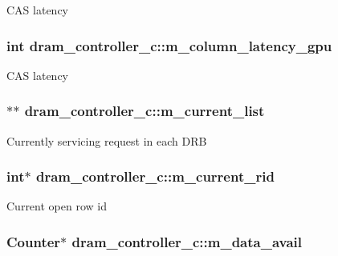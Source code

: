 \label{classdram__controller__c_a5f58c9560276617cab02c610b01b2cb1}
CAS latency \hypertarget{classdram__controller__c_a6b725908a9e2d0f284780dfa345d6160}{
\subsubsection[{m\_\-column\_\-latency\_\-gpu}]{\setlength{\rightskip}{0pt plus 5cm}int {\bf dram\_\-controller\_\-c::m\_\-column\_\-latency\_\-gpu}}}
\label{classdram__controller__c_a6b725908a9e2d0f284780dfa345d6160}
CAS latency \hypertarget{classdram__controller__c_a52b6d16df53c6b0482cbdc782719d3dc}{
\subsubsection[{m\_\-current\_\-list}]{$\ast$$\ast$ {\bf dram\_\-controller\_\-c::m\_\-current\_\-list}}}
\label{classdram__controller__c_a52b6d16df53c6b0482cbdc782719d3dc}
Currently servicing request in each DRB \hypertarget{classdram__controller__c_a7b69bd4b34ed9754a30e69e0bdebb609}{
\subsubsection[{m\_\-current\_\-rid}]{\setlength{\rightskip}{0pt plus 5cm}int$\ast$ {\bf dram\_\-controller\_\-c::m\_\-current\_\-rid}}}
\label{classdram__controller__c_a7b69bd4b34ed9754a30e69e0bdebb609}
Current open row id \hypertarget{classdram__controller__c_a9ff45b23f89fb48e07a21253a28d5903}{
\subsubsection[{m\_\-data\_\-avail}]{\setlength{\rightskip}{0pt plus 5cm}Counter$\ast$ {\bf dram\_\-controller\_\-c::m\_\-data\_\-avail}}}
